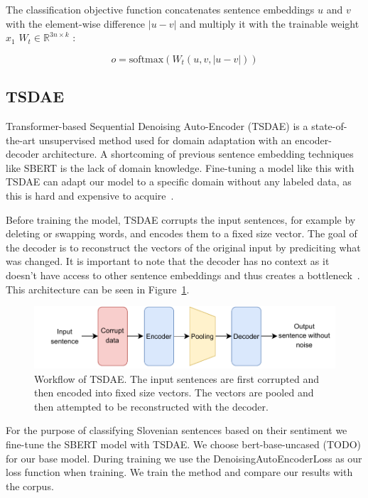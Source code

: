 \documentclass[fleqn,moreauthors,10pt]{ds_report}
\begin{document}
The classification objective function concatenates sentence embeddings \(u\) and \(v\) with the element-wise difference \(|u - v|\) and multiply it with the trainable weight \(x_1\) \( W_t \in \mathbb{R}^{3n \times k} \) \cite{SBERT}:

\begin{equation}
o = \text{softmax}(W_t(u, v, |u - v|))
\label{eq:softmax}
\end{equation}


\subsection*{TSDAE}

Transformer-based Sequential Denoising Auto-Encoder (TSDAE) is a state-of-the-art unsupervised method used for domain adaptation with an encoder-decoder architecture. A shortcoming of previous sentence embedding techniques like SBERT is the lack of domain knowledge. Fine-tuning a model like this with TSDAE can adapt our model to a specific domain without any labeled data, as this is hard and expensive to acquire~\cite{wang-etal-2021-tsdae-using}. 

Before training the model, TSDAE corrupts the input sentences, for example by deleting or swapping words, and encodes them to a fixed size vector. The goal of the decoder is to reconstruct the vectors of the original input by prediciting what was changed. It is important to note that the decoder has no context as it doesn't have access to other sentence embeddings and thus creates a bottleneck~\cite{wang-etal-2021-tsdae-using}. This architecture can be seen in Figure~\ref{fig:tsdae}.

\begin{figure}[ht]\centering
	\vspace{12 pt}
	\includegraphics[width=\linewidth]{TSDAE_scheme.pdf}
	\vspace{5 pt}
	\caption{Workflow of TSDAE. The input sentences are first corrupted and then encoded into fixed size vectors. The vectors are pooled and then attempted to be reconstructed with the decoder.}
	\label{fig:tsdae}
\end{figure}

For the purpose of classifying Slovenian sentences based on their sentiment we fine-tune the SBERT model with TSDAE. We choose bert-base-uncased (TODO) for our base model. During training we use the DenoisingAutoEncoderLoss as our loss function when training. We train the method and compare our results with the corpus.
\end{document}
